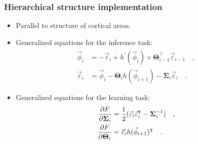 \documentclass[aspectratio=169]{beamer}
\newcommand{\transpose}{\intercal}
\begin{document}
\begin{frame}
  \frametitle{Hierarchical structure implementation}
  \begin{itemize}
    \item<1-> Parallel to structure of cortical areas.
    \item<2-> Generalized equations for the inference task:
      \begin{align}
        \label{eq:dynamical_system_phi}
        \dot{\vec{\phi}}_i & = - \vec{\varepsilon}_i + h^\prime(\vec{\phi}_i) \times \boldsymbol{\Theta}_{i-1}^\transpose \vec{\varepsilon}_{i-1}
        \quad , \\
        \label{eq:dynamical_system_epsilon}
        \dot{\vec{\varepsilon}}_i & = \vec{\phi}_i - \boldsymbol{\Theta}_i h(\vec{\phi}_{i+1}) - \boldsymbol{\Sigma}_i \vec{\varepsilon}_i
        \quad .
      \end{align}
    \item<2-> Generalized equations for the learning task:
      \begin{align}
        \label{eq:dynamical_system_sigma}
        \pdv{F}{\boldsymbol{\Sigma}_i} & = \frac{1}{2} (\vec{\varepsilon}_i \vec{\varepsilon}_i^\transpose - \boldsymbol{\Sigma}_i^{-1})
        \quad , \\
        \label{eq:dynamical_system_theta}
        \pdv{F}{\boldsymbol{\Theta}_i} & = \vec{\varepsilon}_i h(\vec{\phi}_{i+1})^\transpose
        \quad .
      \end{align}
  \end{itemize}
\end{frame}
\end{document}
